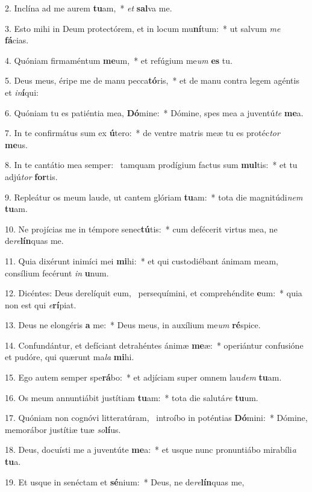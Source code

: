 2. Inclína ad me aurem \textbf{tu}am,~*  \textit{et} \textbf{sal}va me.\

3. Esto mihi in Deum protectórem, et in locum mu\textbf{ní}tum:~*  ut salvum \textit{me} \textbf{fá}cias.\

4. Quóniam firmaméntum \textbf{me}um,~*  et refúgium me\textit{um} \textbf{es} tu.\

5. Deus meus, éripe me de manu pecca\textbf{tó}ris,~*  et de manu contra legem agéntis et \textit{in}\textbf{í}qui:\

6. Quóniam tu es patiéntia mea, \textbf{Dó}mine:~*  Dómine, spes mea a juventú\textit{te} \textbf{me}a.\

7. In te confirmátus sum ex \textbf{ú}tero:~*  de ventre matris meæ tu es protéc\textit{tor} \textbf{me}us.\

8. In te cantátio mea semper: \dag\  tamquam prodígium factus sum \textbf{mul}tis:~*  et tu adjú\textit{tor} \textbf{for}tis.\

9. Repleátur os meum laude, ut cantem glóriam \textbf{tu}am:~*  tota die magnitúdi\textit{nem} \textbf{tu}am.\

10. Ne projícias me in témpore senec\textbf{tú}tis:~*  cum defécerit virtus mea, ne de\textit{re}\textbf{lín}quas me.\

11. Quia dixérunt inimíci mei \textbf{mi}hi:~*  et qui custodiébant ánimam meam, consílium fecérunt \textit{in} \textbf{u}num.\

12. Dicéntes: Deus derelíquit eum, \dag\  persequímini, et comprehéndite \textbf{e}um:~*  quia non est qui \textit{e}\textbf{rí}piat.\

13. Deus ne elongéris \textbf{a} me:~*  Deus meus, in auxílium me\textit{um} \textbf{ré}spice.\

14. Confundántur, et defíciant detrahéntes ánimæ \textbf{me}æ:~*  operiántur confusióne et pudóre, qui quærunt ma\textit{la} \textbf{mi}hi.\

15. Ego autem semper spe\textbf{rá}bo:~*  et adjíciam super omnem lau\textit{dem} \textbf{tu}am.\

16. Os meum annuntiábit justítiam \textbf{tu}am:~*  tota die salutá\textit{re} \textbf{tu}um.\

17. Quóniam non cognóvi litteratúram, \dag\  introíbo in poténtias \textbf{Dó}mini:~*  Dómine, memorábor justítiæ tuæ \textit{so}\textbf{lí}us.\

18. Deus, docuísti me a juventúte \textbf{me}a:~*  et usque nunc pronuntiábo mirabíli\textit{a} \textbf{tu}a.\

19. Et usque in senéctam et \textbf{sé}nium:~*  Deus, ne de\textit{re}\textbf{lín}quas me,\

